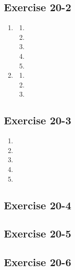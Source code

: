 \subsection{Exercise 20-2}
\begin{multicols}{4}
 \begin{enumerate}[noitemsep, label=\textbf{(\arabic*)} ]
  \item 
\begin{enumerate}[noitemsep, label=\textbf{(\alph*)} ]
 \item 
\item 
\item 
\item 
\item 
\end{enumerate}
  \item 
\begin{enumerate}[noitemsep, label=\textbf{(\alph*)} ]
 \item 
\item 
\item 
\end{enumerate}
 \end{enumerate}
\end{multicols}

\subsection{Exercise 20-3}
\begin{multicols}{3}
 \begin{enumerate}[noitemsep, label=\textbf{(\arabic*)} ]
  \item 
\item
\item 
\item
\item
 \end{enumerate}
\end{multicols}

\subsection{Exercise 20-4}

\subsection{Exercise 20-5}
\subsection{Exercise 20-6}
